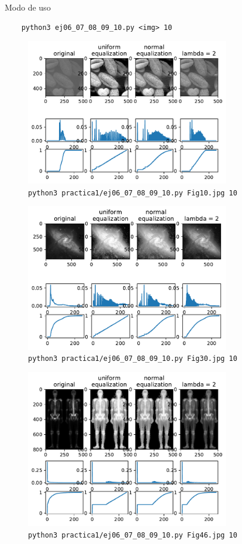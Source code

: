 \documentclass[11pt, spanish]{article}
\begin{document}
Modo de uso
\begin{verbatim}
    python3 ej06_07_08_09_10.py <img> 10
\end{verbatim}

\begin{figure}[H]
\centering
  \includegraphics[width=0.8\textwidth]{informe-imgs/ej10-1.pdf}
  \caption{\texttt{python3 practica1/ej06\_07\_08\_09\_10.py Fig10.jpg 10}}
\end{figure}

\begin{figure}[H]
\centering
  \includegraphics[width=0.8\textwidth]{informe-imgs/ej10-2.pdf}
  \caption{\texttt{python3 practica1/ej06\_07\_08\_09\_10.py Fig30.jpg 10}}
\end{figure}

\begin{figure}[H]
\centering
  \includegraphics[width=0.8\textwidth]{informe-imgs/ej10-3.pdf}
  \caption{\texttt{python3 practica1/ej06\_07\_08\_09\_10.py Fig46.jpg 10}}
\end{figure}
\end{document}
